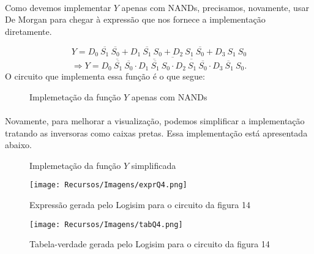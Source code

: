 \documentclass[a4paper, 12pt]{article}
\begin{document}
\paragraph{}
Como devemos implementar $Y$ apenas com NANDs, precisamos, novamente, usar De Morgan para chegar à expressão que nos fornece a implementação diretamente.

\[
Y = D_0 \ \overline{S_1} \ \overline{S_0} + D_1 \ \overline{S_1} \ S_0 + D_2 \ S_1 \ \overline{S_0} + D_3 \ S_1 \ S_0
\]
\[
\Rightarrow Y = \overline{\overline{D_0 \ \overline{S_1} \ \overline{S_0}} \cdot \overline{D_1 \ \overline{S_1} \ S_0} \cdot \overline{D_2 \ S_1 \ \overline{S_0}} \cdot \overline{D_3 \ S_1 \ S_0}}.
\]
O circuito que implementa essa função é o que segue:

\begin{figure}[H]
    \centering
    
    \vspace{-30pt}
    \caption{Implemetação da função $Y$ apenas com NANDs}
\end{figure}

\paragraph{}
Novamente, para melhorar a visualização, podemos simplificar a implementação tratando as inversoras como caixas pretas. Essa implementação está apresentada abaixo.

\begin{figure}[H]
    \centering
    
    \vspace{-30pt}
    \caption{Implemetação da função $Y$ simplificada}
\end{figure}

\begin{figure}[H]
    \centering
    \texttt{[image: Recursos/Imagens/exprQ4.png]}
    \caption{Expressão gerada pelo Logisim para o circuito da figura 14}
\end{figure}

\begin{figure}[H]
    \centering
    \texttt{[image: Recursos/Imagens/tabQ4.png]}
    \caption{Tabela-verdade gerada pelo Logisim para o circuito da figura 14}
\end{figure}
\end{document}
